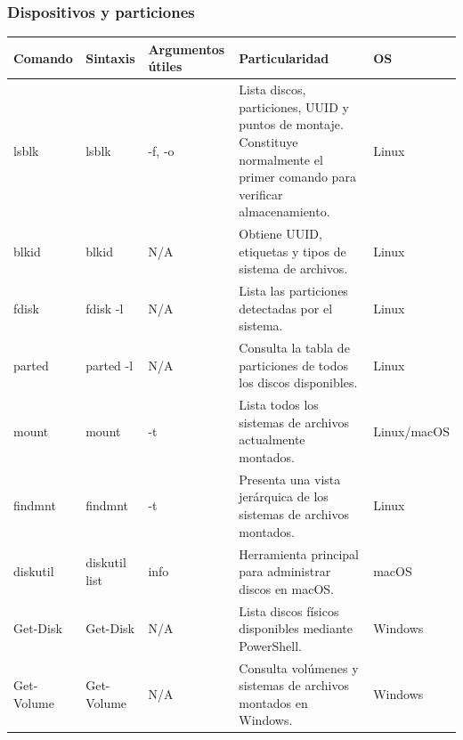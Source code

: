 \documentclass[a4paper,10pt]{article}
\begin{document}

\subsubsection{Dispositivos y particiones}

\begin{longtable}{|p{2.8cm}|p{3.2cm}|p{4cm}|p{5.4cm}|p{1.5cm}|}

\hline
Comando &
Sintaxis &
Argumentos útiles &
Particularidad &
OS
\\
\hline
\endhead

lsblk &
lsblk &
-f, -o &
Lista discos, particiones, UUID y puntos de montaje. Constituye normalmente el primer comando para verificar almacenamiento. &
Linux
\\
\hline

blkid &
blkid &
N/A &
Obtiene UUID, etiquetas y tipos de sistema de archivos. &
Linux
\\
\hline

fdisk &
fdisk -l &
N/A &
Lista las particiones detectadas por el sistema. &
Linux
\\
\hline

parted &
parted -l &
N/A &
Consulta la tabla de particiones de todos los discos disponibles. &
Linux
\\
\hline

mount &
mount &
-t &
Lista todos los sistemas de archivos actualmente montados. &
Linux/macOS
\\
\hline

findmnt &
findmnt &
-t &
Presenta una vista jerárquica de los sistemas de archivos montados. &
Linux
\\
\hline

diskutil &
diskutil list &
info &
Herramienta principal para administrar discos en macOS. &
macOS
\\
\hline

Get-Disk &
Get-Disk &
N/A &
Lista discos físicos disponibles mediante PowerShell. &
Windows
\\
\hline

Get-Volume &
Get-Volume &
N/A &
Consulta volúmenes y sistemas de archivos montados en Windows. &
Windows
\\
\hline

\end{longtable}

\end{document}
